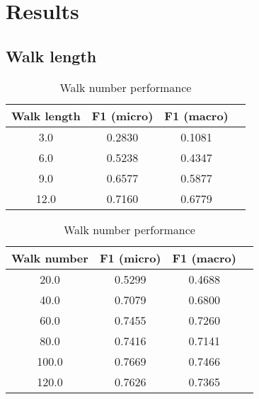 \documentclass[a4paper,10pt]{article}
\begin{document}
\section{Results}

\subsection{Walk length}

\begin{table}[!hbtp]

  \centering

  \begin{minipage}[b]{0.48\textwidth}

    \begin{tabular}{c c c c}

      \hline
      Walk length & F1 (micro)  & F1 (macro) \\
      \hline\hline

      3.0	& 0.2830	& 0.1081 \\
      \hline
      6.0	& 0.5238	& 0.4347 \\
      \hline
      9.0	& 0.6577	& 0.5877 \\
      \hline
      12.0	& 0.7160	& 0.6779 \\
      \hline

    \end{tabular}

    \caption{Walk length performance}
    \label{tbl:cora:performance:walk_length}

  \end{minipage}
\hfill
  \begin{minipage}[b]{0.48\textwidth}

    \begin{tabular}{c c c c}

      \hline
      Walk number & F1 (micro)  & F1 (macro) \\
      \hline\hline

      20.0	&  0.5299	&  0.4688 \\
      \hline
      40.0	&  0.7079	&  0.6800 \\
      \hline
      60.0	&  0.7455	&  0.7260 \\
      \hline
      80.0	&  0.7416	&  0.7141 \\
      \hline
      100.0	&  0.7669	&  0.7466 \\
      \hline
      120.0	&  0.7626	&  0.7365 \\
      \hline

    \end{tabular}

    \caption{Walk number performance}
    \label{tbl:cora:performance:walk_number}

  \end{minipage}

\end{table}
\end{document}
